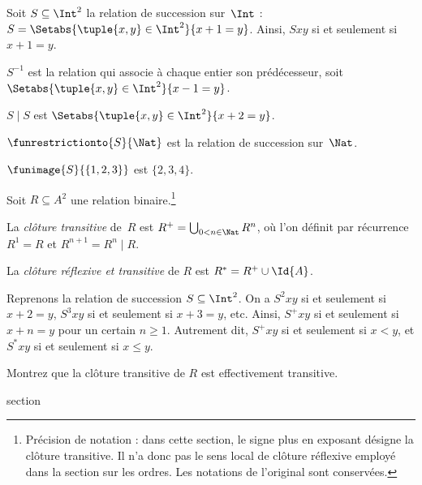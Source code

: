 \documentclass[11pt,a4paper,openany]{memoir}
\begin{document}
\begin{ex}
Soit $S \subseteq \Int^2$ la relation de succession sur~$\Int$ :
$S = \Setabs{\tuple{x, y} \in \Int^2}{x + 1 = y}$.
Ainsi, $Sxy$ si et seulement si $x + 1 = y$.

$S^{-1}$ est la relation qui associe à chaque entier son prédécesseur,
soit $\Setabs{\tuple{x,y}\in\Int^2}{x -1 =y}$.

$S\mid S$ est $ \Setabs{\tuple{x,y}\in\Int^2}{x + 2 =y}$.

$\funrestrictionto{S}{\Nat}$ est la relation de succession sur~$\Nat$.

$\funimage{S}{\{1,2,3\}}$ est $\{2, 3, 4\}$.
\end{ex}

\begin{defn}
Soit $R \subseteq A^2$ une relation binaire.\footnote{Précision de notation :
dans cette section, le signe plus en exposant désigne la clôture transitive.
Il n’a donc pas le sens local de clôture réflexive employé dans la
section sur les ordres. Les notations de l’original sont conservées.}

La \emph{clôture transitive} de~$R$ est
$R^+ = \bigcup_{0 < n \in \Nat} R^n$, où l’on définit par récurrence
$R^1 = R$ et $R^{n+1} = R^n \mid R$.

La \emph{clôture réflexive et transitive} de $R$ est
$R^* = R^+ \cup \Id{A}$.
\end{defn}

\begin{ex}
Reprenons la relation de succession $S \subseteq \Int^2$.
On a $S^2xy$ si et seulement si $x + 2 = y$, $S^3xy$ si et seulement si
$x + 3 = y$, etc. Ainsi, $S^+xy$ si et seulement si $x + n = y$
pour un certain $n \geq 1$. Autrement dit, $S^+xy$ si et seulement si
$x < y$, et $S^*xy$ si et seulement si $x \le y$.
\end{ex}

\begin{prob}
Montrez que la clôture transitive de $R$ est effectivement transitive.
\end{prob}


\endgroup


\OLEndChapterHook


\endgroup


\begingroup
\expandafter\def\csname ol@sectioncs\endcsname{section}
\def\olfilename{functions}
\end{document}
